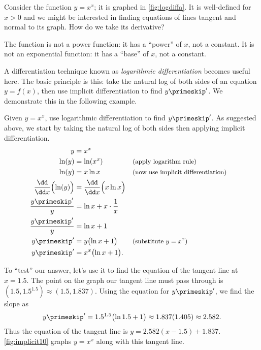 Consider the function $y=x^x$; it is graphed in \autoref{fig:logdiffa}. It is well-defined for $x>0$ and we might be interested in finding equations of lines tangent and normal to its graph. How do we take its derivative?

The function is not a power function: it has a ``power'' of $x$, not a constant. It is not an exponential function: it has a ``base'' of $x$, not a constant. 

A differentiation technique known as \emph{logarithmic differentiation} becomes useful here. The basic principle is this: take the natural log of both sides of an equation $y=f(x)$, then use implicit differentiation to find $y\primeskip'$. We demonstrate this in the following example.

\begin{example}\label{ex_implicit10}
Given $y=x^x$, use logarithmic differentiation to find $y\primeskip'$.
\solution
As suggested above, we start by taking the natural log of both sides then applying implicit differentiation.
\begin{align*}
y &= x^x \\
\ln (y) &= \ln (x^x) && \text{\small (apply logarithm rule)}\\
\ln (y) &= x\ln x && \text{\small (now use implicit differentiation)}\\
\frac{\dd}{\dd x}\Bigl(\ln (y)\Bigr) &= \frac{\dd}{\dd x}\Bigl(x\ln x\Bigr) \\
\frac{y\primeskip'}{y} &= \ln x + x\cdot\frac1x\\
\frac{y\primeskip'}{y} &= \ln x + 1\\
y\primeskip'
&= y\bigl(\ln x+1\bigr) && \text{\small (substitute $y=x^x$)}\\
y\primeskip' &= x^x\bigl(\ln x+1\bigr).
\end{align*} 


To ``test'' our answer, let's use it to find the equation of the tangent line at $x=1.5$. The point on the graph our tangent line must pass through is $(1.5, 1.5^{1.5}) \approx (1.5, 1.837)$. Using the equation for $y\primeskip'$, we find the slope as
\[y\primeskip' = 1.5^{1.5}\bigl(\ln 1.5+1\bigr) \approx 1.837(1.405) \approx 2.582.\]
Thus the equation of the tangent line is $y = 2.582(x-1.5)+1.837$. \autoref{fig:implicit10} graphs $y=x^x$ along with this tangent line.
\end{example}



